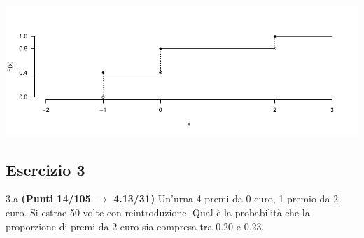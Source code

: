 \documentclass[
  11pt,
]{book}
\theoremstyle{mytheoremstyle}
\theoremstyle{mydefstyle}
\newenvironment{sol}
  {
  \begin{tcolorbox}[enhanced,breakable,arc=0.1mm,boxrule=1pt,colback=white,colframe=iblue,
  title=\bf \fontfamily{lmss}\selectfont \hspace{.5 cm} Soluzione,drop fuzzy shadow]

}{
\end{tcolorbox}
  }
\begin{document}
\begin{sol}

\begin{center}\includegraphics{Esami_passati_con_soluzioni_files/figure-latex/2024-88-1} \end{center}

\end{sol}

\subsection{Esercizio 3}\label{esercizio-3-38}

3.a \textbf{(Punti 14/105 \(\rightarrow\) 4.13/31)} Un'urna 4 premi da \(\mbox{0}\) euro, 1 premio da \(\mbox{2}\) euro.
Si estrae 50 volte con reintroduzione.
Qual è la probabilità che la proporzione di premi da 2 euro sia compresa tra 0.20 e 0.23.
\end{document}
